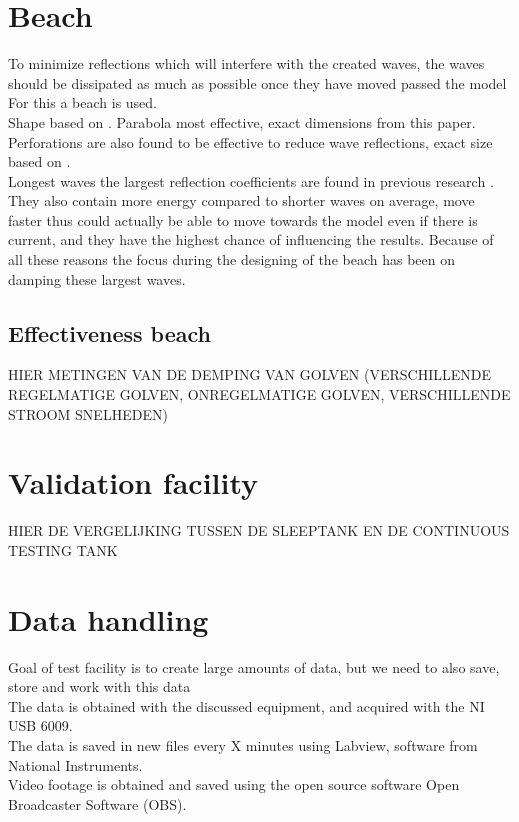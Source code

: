 \section{Beach}
\label{sec:beach}
To minimize reflections which will interfere with the created waves, the waves should be dissipated as much as possible once they have moved passed the model \\
For this a beach is used. \\
Shape based on \cite{Hodaei2016}. Parabola most effective, exact dimensions from this paper. Perforations are also found to be effective to reduce wave reflections, exact size based on \citet{Chegini1994}. \\
Longest waves the largest reflection coefficients are found in previous research \cite{Suh2003}. They also contain more energy compared to shorter waves on average, move faster thus could actually be able to move towards the model even if there is current, and they have the highest chance of influencing the results. Because of all these reasons the focus during the designing of the beach has been on damping these largest waves.

\subsection{Effectiveness beach}
\label{sec:results_beach}
HIER METINGEN VAN DE DEMPING VAN GOLVEN (VERSCHILLENDE REGELMATIGE GOLVEN, ONREGELMATIGE GOLVEN, VERSCHILLENDE STROOM SNELHEDEN)

\section{Validation facility}
\label{sec:validation_facility}
HIER DE VERGELIJKING TUSSEN DE SLEEPTANK EN DE CONTINUOUS TESTING TANK


\section{Data handling}
\label{sec:data_handeling}
Goal of test facility is to create large amounts of data, but we need to also save, store and work with this data \\
The data is obtained with the discussed equipment, and acquired with the NI USB 6009. \\
The data is saved in new files every X minutes using Labview, software from National Instruments. \\
Video footage is obtained and saved using the open source software Open Broadcaster Software (OBS). 

